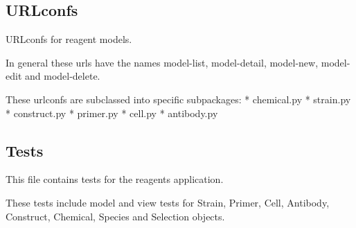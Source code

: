 \documentclass[letterpaper,10pt,english]{sphinxmanual}
\begin{document}
\subsection{URLconfs}
\label{api:id21}\label{api:module-experimentdb.reagents.urls}
URLconfs for reagent models.


In general these urls have the names model-list, model-detail, model-new, model-edit and model-delete.


These urlconfs are subclassed into specific subpackages:
* chemical.py
* strain.py
* construct.py
* primer.py
* cell.py
* antibody.py



\subsection{Tests}
\label{api:id22}\label{api:module-experimentdb.reagents.tests}
This file contains tests for the reagents application.


These tests include model and view tests for Strain, Primer, Cell, Antibody, Construct, Chemical, Species and Selection objects.

\end{document}
